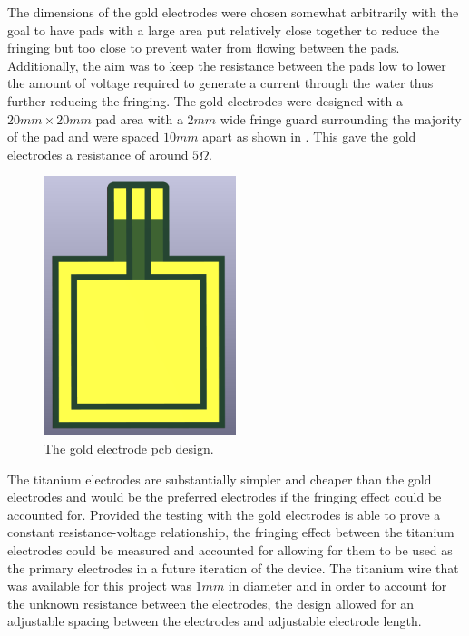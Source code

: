 The dimensions of the gold electrodes were chosen somewhat arbitrarily with the goal to have pads with a large area put relatively close together to reduce the fringing but too close to prevent water from flowing between the pads.
Additionally, the aim was to keep the resistance between the pads low to lower the amount of voltage required to generate a current through the water thus further reducing the fringing. 
The gold electrodes were designed with a $20mm \times 20mm$ pad area with a $2mm$ wide fringe guard surrounding the majority of the pad and were spaced $10mm$ apart as shown in .
This gave the gold electrodes a resistance of around $5\Omega$.
\begin{figure}
    \centering
    \includegraphics[width=0.5\textwidth]{Figures/GoldElectrode}
    \caption{The gold electrode \gls{pcb} design.}
    \label{fig:gold-electrode} %
\end{figure}

The titanium electrodes are substantially simpler and cheaper than the gold electrodes and would be the preferred electrodes if the fringing effect could be accounted for.
Provided the testing with the gold electrodes is able to prove a constant resistance-voltage relationship, the fringing effect between the titanium electrodes could be measured and accounted for allowing for them to be used as the primary electrodes in a future iteration of the device.
The titanium wire that was available for this project was $1mm$ in diameter and in order to account for the unknown resistance between the electrodes, the design allowed for an adjustable spacing between the electrodes and adjustable electrode length.

